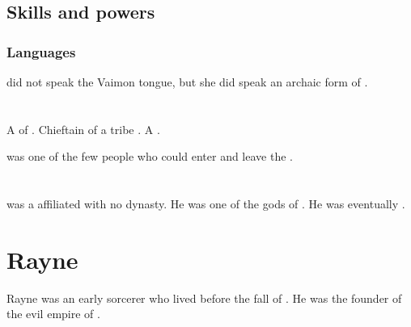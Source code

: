 \subsection{Skills and powers}





\subsubsection{Languages}
\Lethiarch did not speak the Vaimon tongue, but she did speak an archaic form of . 















\section{\Najarod}
\index{\Najarod}
A \resphan{} of \Baelzerach. 
Chieftain of a tribe  \QuessanthIshnaruchaefir. 
A .

\Najarod{} was one of the few people who could enter and leave the . 















\section{\Osra}
\index{\Osra}
\Osra was a \bezed \resphan affiliated with no dynasty. 
He was one of the gods of . 
He was eventually . 















\section{Rayne \Tarcharos}
Rayne \Tarcharos was an early \resphan sorcerer who lived before the fall of \Merkyrah.
He was the founder of the evil empire of .















